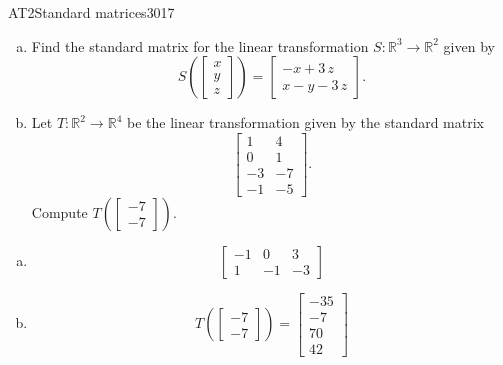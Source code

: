 \begin{exercise}{AT2}{Standard matrices}{3017} 
\begin{exerciseStatement} 

\begin{enumerate}[(a)]
\item Find the standard matrix for the linear transformation \(S:\mathbb{R}^3 \to \mathbb{R}^2\) given by \[S\left( \left[\begin{array}{c}
x \\
y \\
z
\end{array}\right] \right) = \left[\begin{array}{c}
-x + 3 \, z \\
x - y - 3 \, z
\end{array}\right].\] 
\item Let \(T:\mathbb{R}^2 \to \mathbb{R}^4\) be the linear transformation given by the standard matrix \[\left[\begin{array}{cc}
1 & 4 \\
0 & 1 \\
-3 & -7 \\
-1 & -5
\end{array}\right].\] Compute \(T\left(\left[\begin{array}{c}
-7 \\
-7
\end{array}\right]\right)\). 
\end{enumerate}

     \end{exerciseStatement}
 \begin{exerciseAnswer} 

\begin{enumerate}[(a)]
\item  \[\left[\begin{array}{ccc}
-1 & 0 & 3 \\
1 & -1 & -3
\end{array}\right]\] 
\item  \[T\left(\left[\begin{array}{c}
-7 \\
-7
\end{array}\right]\right)=\left[\begin{array}{c}
-35 \\
-7 \\
70 \\
42
\end{array}\right]\] 
\end{enumerate}

     \end{exerciseAnswer}
 \end{exercise}


